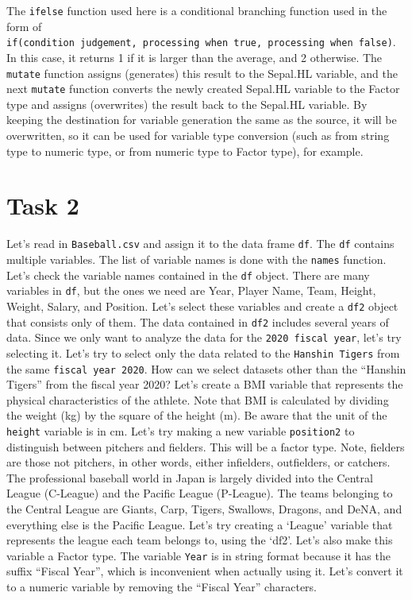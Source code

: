 \documentclass[
  a4paper,
]{book}
\begin{document}
The \texttt{ifelse} function used here is a conditional branching
function used in the form of
\texttt{if(condition\ judgement,\ processing\ when\ true,\ processing\ when\ false)}.
In this case, it returns 1 if it is larger than the average, and 2
otherwise. The \texttt{mutate} function assigns (generates) this result
to the Sepal.HL variable, and the next \texttt{mutate} function converts
the newly created Sepal.HL variable to the Factor type and assigns
(overwrites) the result back to the Sepal.HL variable. By keeping the
destination for variable generation the same as the source, it will be
overwritten, so it can be used for variable type conversion (such as
from string type to numeric type, or from numeric type to Factor type),
for example.

\section{Task 2}\label{task-2}

Let's read in \texttt{Baseball.csv} and assign it to the data frame
\texttt{df}. The \texttt{df} contains multiple variables. The list of
variable names is done with the \texttt{names} function. Let's check the
variable names contained in the \texttt{df} object. There are many
variables in \texttt{df}, but the ones we need are Year, Player Name,
Team, Height, Weight, Salary, and Position. Let's select these variables
and create a \texttt{df2} object that consists only of them. The data
contained in \texttt{df2} includes several years of data. Since we only
want to analyze the data for the \texttt{2020\ fiscal\ year}, let's try
selecting it. Let's try to select only the data related to the
\texttt{Hanshin\ Tigers} from the same \texttt{fiscal\ year\ 2020}. How
can we select datasets other than the ``Hanshin Tigers'' from the fiscal
year 2020? Let's create a BMI variable that represents the physical
characteristics of the athlete. Note that BMI is calculated by dividing
the weight (kg) by the square of the height (m). Be aware that the unit
of the \texttt{height} variable is in cm. Let's try making a new
variable \texttt{position2} to distinguish between pitchers and
fielders. This will be a factor type. Note, fielders are those not
pitchers, in other words, either infielders, outfielders, or catchers.
The professional baseball world in Japan is largely divided into the
Central League (C-League) and the Pacific League (P-League). The teams
belonging to the Central League are Giants, Carp, Tigers, Swallows,
Dragons, and DeNA, and everything else is the Pacific League. Let's try
creating a `League' variable that represents the league each team
belongs to, using the `df2'. Let's also make this variable a Factor
type. The variable \texttt{Year} is in string format because it has the
suffix ``Fiscal Year'', which is inconvenient when actually using it.
Let's convert it to a numeric variable by removing the ``Fiscal Year''
characters.
\end{document}
